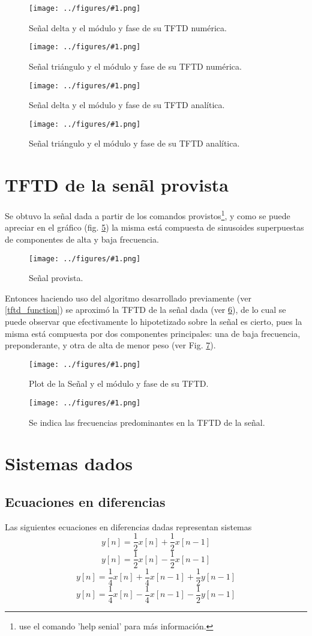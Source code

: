 \documentclass[letterpaper, 10 pt, conference]{ieeeconf}  %
\newcommand{\image}[2] {
  \begin{figure}[H]
    \centering
    \texttt{[image: ../figures/\#1.png]}
    \caption{#2}
    \label{fig:#1}
  \end{figure}
}
\begin{document}
\image{delta_tftd}{Se\~{n}al delta y el m\'odulo y fase de su TFTD num\'erica.}
\image{triangulo_tftd}{Se\~{n}al tri\'angulo y el m\'odulo y fase de su TFTD num\'erica.}
\image{delta_tftd_analitica}{Se\~{n}al delta y el m\'odulo y fase de su TFTD anal\'itica.}
\image{triangulo_tftd_analitica}{Se\~{n}al tri\'angulo y el m\'odulo y fase de su TFTD anal\'itica.}


\section{TFTD de la sen\~al provista}

Se obtuvo la se\~nal dada a partir de los comandos provistos\footnote{use el comando 'help senial' para m\'as informaci\'on.}, y como se puede apreciar en el gr\'afico (fig. \ref{fig:senial}) la misma est\'a compuesta de sinusoides superpuestas de componentes de alta y baja frecuencia.
\image{senial}{Se\~nal provista.}

Entonces haciendo uso del algoritmo desarrollado previamente (ver \ref{tftd_function}) se aproxim\'o la TFTD de la se\~{n}al dada (ver \ref{fig:senial_y_su_tftd}), de lo cual se puede observar que efectivamente lo hipotetizado sobre la se\~{n}al es cierto, pues la misma est\'a compuesta por dos componentes principales: una de baja frecuencia, preponderante, y otra de alta de menor peso (ver Fig. \ref{fig:tftd_senial_freqs}).
\image{senial_y_su_tftd}{Plot de la Se\~{n}al y el m\'odulo y fase de su TFTD.}
\image{tftd_senial_freqs}{Se indica las frecuencias predominantes en la TFTD de la se\~nal.}

\section{Sistemas dados}
\subsection{Ecuaciones en diferencias}
Las siguientes ecuaciones en diferencias dadas representan sistemas
\begin{equation} \label{eq1}
y[n] = \frac{1}{2}x[n] + \frac{1}{2}x[n-1]
\end{equation}
\begin{equation} \label{eq2}
y[n] = \frac{1}{2}x[n] - \frac{1}{2}x[n-1]
\end{equation}
\begin{equation} \label{eq3}
y[n] = \frac{1}{4}x[n] + \frac{1}{4}x[n-1] + \frac{1}{2}y[n-1]
\end{equation}
\begin{equation} \label{eq4}
y[n] = \frac{1}{4}x[n] - \frac{1}{4}x[n-1] - \frac{1}{2}y[n-1]
\end{equation}
\end{document}
